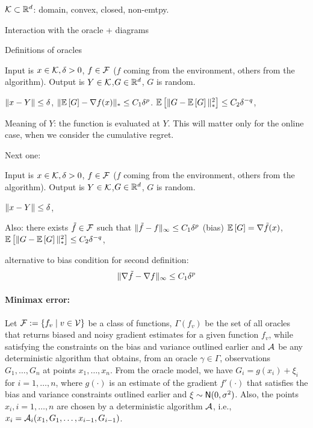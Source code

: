 
$\mathcal{K} \subset \mathbb{R}^d$: domain, convex, closed, non-emtpy.

Interaction with the oracle + diagrams

Definitions of oracles

\begin{definition}
Input is $x\in \mathcal{K},\delta>0$,
$f\in \mathcal{F}$ ($f$ coming from the environment, others from the algorithm).
Output is $Y\in \mathcal{K}$,$G\in \mathbb{R}^d$, $G$ is random.

$\|x-Y\|\le \delta$, 
$\| \mathbb{E}\left[G\right]  - \nabla f(x)  \|_* \le C_1 \delta^p$.
$\mathbb{E}\left[\| G -  \mathbb{E}\left[G\right] \|_*^2\right] \le C_2 \delta^{-q}$,

Meaning of $Y$: the function is evaluated at $Y$. This will matter only for the online case, when we consider the cumulative regret.
\end{definition}

Next one:

\begin{definition}
Input is $x\in \mathcal{K},\delta>0$,
$f\in \mathcal{F}$ ($f$ coming from the environment, others from the algorithm).
Output is $Y\in \mathcal{K}$,$G\in \mathbb{R}^d$, $G$ is random.

$\|x-Y\|\le \delta$, 

Also: there exists $\tilde{f} \in \mathcal{F}$ such that 
$\|\tilde{f}- f\|_\infty \le C_1 \delta^p$ (bias)
$\mathbb{E}\left[G\right]  = \nabla \tilde{f}(x)$,
$\mathbb{E}\left[\| G -  \mathbb{E}\left[G\right] \|_*^2\right] \le C_2 \delta^{-q}$,

\end{definition}

alternative to bias condition for second definition:
\begin{align}
\|\nabla \tilde{f}- \nabla f\|_\infty \le C_1 \delta^p
\end{align}


\paragraph{Minimax error:}
Let $\mathcal{F}:= \{ f_v \mid v \in \mathcal{V}\}$ be a class of functions, $\Gamma(f_v)$ be the set of all oracles that returns biased and noisy gradient estimates for a given  function $f_v$, while satisfying the constraints on the bias and variance outlined earlier and $\mathcal{A}$ be any deterministic algorithm that obtains, from an oracle $\gamma \in \Gamma$, observations $G_1, \ldots, G_n$ at points $x_1, \ldots, x_n$. From the oracle model, we have 
$G_i = g(x_i) + \xi_i$ for $i=1,\ldots,n$, where $g(\cdot)$ is an estimate of the gradient $f'(\cdot)$ that satisfies the bias and variance constraints outlined earlier and $\xi \sim \mathsf{N}(0,\sigma^2)$. Also, the points $x_i, i=1,\ldots,n$ are chosen by a deterministic algorithm $\mathcal{A}$, i.e., 
$x_i = \mathcal{A}_i(x_1, G_1, \ldots, x_{i-1}, G_{i-1})$. 

